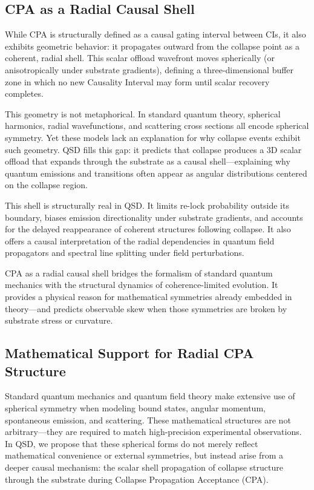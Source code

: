 \documentclass[preprints,article,submit,pdftex,moreauthors]{Definitions/mdpi}
\begin{document}
\subsection{CPA as a Radial Causal Shell}

While CPA is structurally defined as a causal gating interval between CIs, it also exhibits geometric behavior: it propagates outward from the collapse point as a coherent, radial shell. This scalar offload wavefront moves spherically (or anisotropically under substrate gradients), defining a three-dimensional buffer zone in which no new Causality Interval may form until scalar recovery completes.

This geometry is not metaphorical. In standard quantum theory, spherical harmonics, radial wavefunctions, and scattering cross sections all encode spherical symmetry. Yet these models lack an explanation for why collapse events exhibit such geometry. QSD fills this gap: it predicts that collapse produces a 3D scalar offload that expands through the substrate as a causal shell—explaining why quantum emissions and transitions often appear as angular distributions centered on the collapse region.

This shell is structurally real in QSD. It limits re-lock probability outside its boundary, biases emission directionality under substrate gradients, and accounts for the delayed reappearance of coherent structures following collapse. It also offers a causal interpretation of the radial dependencies in quantum field propagators and spectral line splitting under field perturbations.

CPA as a radial causal shell bridges the formalism of standard quantum mechanics with the structural dynamics of coherence-limited evolution. It provides a physical reason for mathematical symmetries already embedded in theory—and predicts observable skew when those symmetries are broken by substrate stress or curvature.

\subsection{Mathematical Support for Radial CPA Structure}

Standard quantum mechanics and quantum field theory make extensive use of spherical symmetry when modeling bound states, angular momentum, spontaneous emission, and scattering. These mathematical structures are not arbitrary—they are required to match high-precision experimental observations. In QSD, we propose that these spherical forms do not merely reflect mathematical convenience or external symmetries, but instead arise from a deeper causal mechanism: the scalar shell propagation of collapse structure through the substrate during Collapse Propagation Acceptance (CPA).
\end{document}
